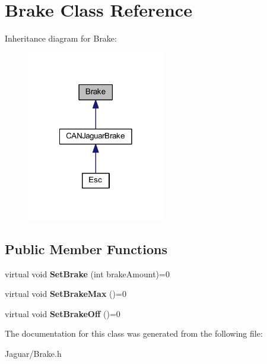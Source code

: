 \hypertarget{class_brake}{
\section{\-Brake \-Class \-Reference}
\label{class_brake}
}


\-Inheritance diagram for \-Brake\-:\nopagebreak
\begin{figure}[H]
\begin{center}
\leavevmode
\includegraphics[width=170pt]{class_brake__inherit__graph}
\end{center}
\end{figure}
\subsection*{\-Public \-Member \-Functions}
\begin{DoxyCompactItemize}
\item 
\hypertarget{class_brake_afd1b5ebb817395bcd0bc60ad1e304abd}{
virtual void {\bfseries \-Set\-Brake} (int brake\-Amount)=0}
\label{class_brake_afd1b5ebb817395bcd0bc60ad1e304abd}

\item 
\hypertarget{class_brake_adab276b87d93d94adefd8550abfa7da6}{
virtual void {\bfseries \-Set\-Brake\-Max} ()=0}
\label{class_brake_adab276b87d93d94adefd8550abfa7da6}

\item 
\hypertarget{class_brake_a055b07829bc5fa41fb54e499c177961b}{
virtual void {\bfseries \-Set\-Brake\-Off} ()=0}
\label{class_brake_a055b07829bc5fa41fb54e499c177961b}

\end{DoxyCompactItemize}


\-The documentation for this class was generated from the following file\-:\begin{DoxyCompactItemize}
\item 
\-Jaguar/\-Brake.\-h\end{DoxyCompactItemize}
